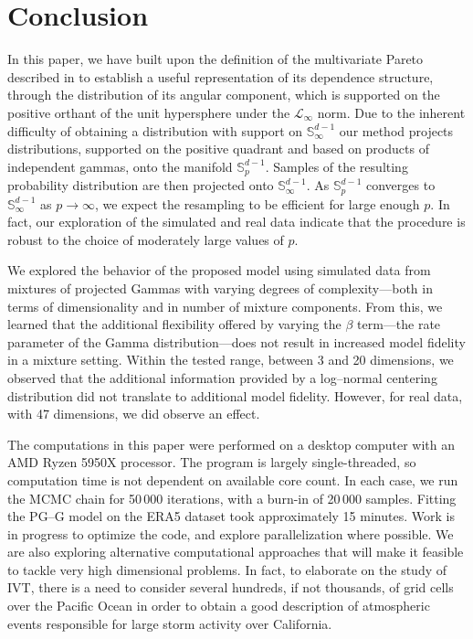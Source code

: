 \section{Conclusion\label{sec:conclusion}}
In this paper, we have built upon the definition of the multivariate Pareto described in \cite{ferreira2014}
  to establish a useful representation of its dependence structure, through
  the distribution of its angular component, which is supported on the positive orthant of the unit
  hypersphere under the $\mathcal{L}_{\infty}$ norm.  Due to the 
  inherent difficulty of obtaining a distribution with support on ${\mathbb S}^{d-1}_\infty$
  our method projects distributions, supported on the positive quadrant and
  based on products of independent gammas,  onto the manifold
  ${\mathbb S}_{p}^{d-1}$. Samples of the resulting probability distribution 
  are then projected onto ${\mathbb S}_{\infty}^{d-1}$.  
  As ${\mathbb S}_{p}^{d-1}$ converges to ${\mathbb S}_{\infty}^{d-1}$ as $
  p\to\infty$, we expect the resampling to be efficient for large enough
  $p$. In fact, our exploration of the simulated and real data indicate
  that the procedure is robust to the choice of moderately large values
  of $p$. 
 
We explored the behavior of the proposed model using simulated data from
    mixtures of projected Gammas with varying degrees of complexity---both in terms of dimensionality and 
    in number of mixture components.  From this, we learned that the additional flexibility 
    offered by varying the $\beta$ term---the rate parameter of the Gamma distribution---does not result 
    in increased model fidelity in a mixture setting.  Within the tested range, between 3 and 20 
    dimensions, we observed that the additional information provided by a log--normal 
    centering distribution did not translate to additional model fidelity.  However, for 
    real data, with 47 dimensions, we did observe an effect.
    
The computations in this paper were performed on a desktop computer with an AMD Ryzen 5950X processor.
  The program is largely single-threaded, so computation time is not dependent on available core count.  In each
  case, we run the MCMC chain for 50\,000 iterations, with a burn-in of 20\,000 samples.  Fitting the PG--G model
  on the ERA5 dataset took approximately 15 minutes.  Work is in progress to optimize the code, and explore
  parallelization where possible.  We are also exploring alternative computational approaches that will make it
  feasible to tackle very high dimensional problems. In fact, to elaborate on the study of IVT, there is a need 
  to consider several hundreds, if not thousands, of grid cells over the Pacific Ocean in order to obtain a 
  good description of atmospheric events responsible for large storm activity over California.
